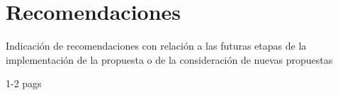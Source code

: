 \chapter{Recomendaciones}

Indicación de recomendaciones con relación a las
futuras etapas de la implementación de la propuesta
o de la consideración de nuevas propuestas

1-2 pags